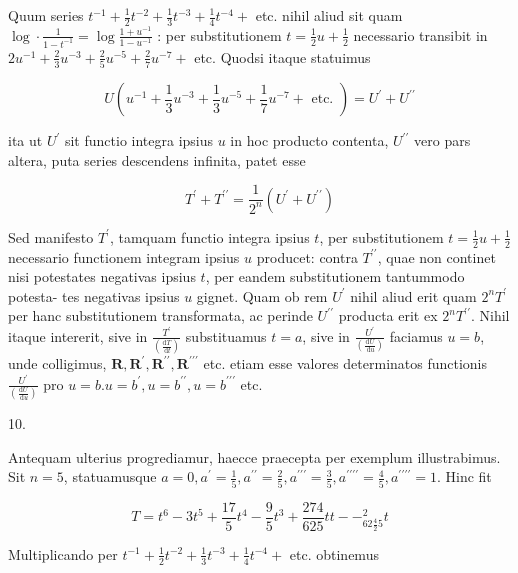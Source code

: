 \documentclass[10pt]{article}
\begin{document}
Quum series \(t^{-1}+\frac{1}{2} t^{-2}+\frac{1}{3} t^{-3}+\frac{1}{4} t^{-4}+\) etc. nihil aliud sit quam \(\log \cdot \frac{1}{1-t^{-1}}=\log \frac{1+u^{-1}}{1-u^{-1}}\) : per substitutionem \(t=\frac{1}{2} u+\frac{1}{2}\) necessario transibit in \(2 u^{-1}+\frac{2}{3} u^{-3}+\frac{2}{5} u^{-5}+\frac{2}{7} u^{-7}+\) etc. Quodsi itaque statuimus

\[
U\left(u^{-1}+\frac{1}{3} u^{-3}+\frac{1}{3} u^{-5}+\frac{1}{7} u^{-7}+\text { etc. }\right)=U^{\prime}+U^{\prime \prime}
\]

ita ut \(U^{\prime}\) sit functio integra ipsius \(u\) in hoc producto contenta, \(U^{\prime \prime}\) vero pars altera, puta series descendens infinita, patet esse

\[
T^{\prime}+T^{\prime \prime}=\frac{1}{2^{n}}\left(U^{\prime}+U^{\prime \prime}\right)
\]

Sed manifesto \(T^{\prime}\), tamquam functio integra ipsius \(t\), per substitutionem \(t=\frac{1}{2} u+\frac{1}{2}\) necessario functionem integram ipsius \(u\) producet: contra \(T^{\prime \prime}\), quae non continet nisi potestates negativas ipsius \(t\), per eandem substitutionem tantummodo potesta-
tes negativas ipsius \(u\) gignet. Quam ob rem \(U^{\prime}\) nihil aliud erit quam \(2^{n} T^{\prime}\) per hanc substitutionem transformata, ac perinde \(U^{\prime \prime}\) producta erit ex \(2^{n} T^{\prime \prime}\). Nihil itaque intererit, sive in \(\frac{T^{\prime}}{\left(\frac{\mathrm{d} T}{\mathrm{~d} t}\right)}\) substituamus \(t=a\), sive in \(\frac{U^{\prime}}{\left(\frac{\mathrm{d} U}{\mathrm{~d} u}\right)}\) faciamus \(u=b\), unde colligimus, \(\boldsymbol{R}, \boldsymbol{R}^{\prime}, \boldsymbol{R}^{\prime \prime}, \boldsymbol{R}^{\prime \prime \prime}\) etc. etiam esse valores determinatos functionis \(\frac{U^{\prime}}{\left(\frac{\mathrm{d} U}{\mathrm{~d} u}\right)}\) pro \(u=b . u=b^{\prime}, u=b^{\prime \prime}, u=b^{\prime \prime \prime}\) etc.

10.

Antequam ulterius progrediamur, haecce praecepta per exemplum illustrabimus. Sit \(n=5\), statuamusque \(a=0, a^{\prime}=\frac{1}{5}, a^{\prime \prime}=\frac{2}{5}, a^{\prime \prime \prime}=\frac{3}{5}, a^{\prime \prime \prime \prime}=\frac{4}{5}, a^{\prime \prime \prime \prime}=1\). Hinc fit

\[
T=t^{6}-3 t^{5}+\frac{17}{5} t^{4}-\frac{9}{5} t^{3}+\frac{274}{625} t t--_{62 \frac{4}{2} 5}^{2} t
\]

Multiplicando per \(t^{-1}+\frac{1}{2} t^{-2}+\frac{1}{3} t^{-3}+\frac{1}{4} t^{-4}+\) etc. obtinemus
\end{document}
